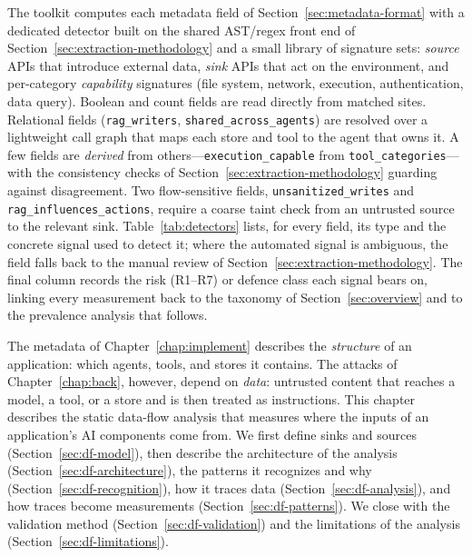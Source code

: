 \label{sec:toolkit}

The toolkit computes each metadata field of Section~\ref{sec:metadata-format}
with a dedicated detector built on the shared AST/regex front end of
Section~\ref{sec:extraction-methodology} and a small library of signature
sets: \emph{source} APIs that introduce external data, \emph{sink} APIs that
act on the environment, and per-category \emph{capability} signatures (file
system, network, execution, authentication, data query). Boolean and count
fields are read directly from matched sites. Relational fields
(\texttt{rag\_writers}, \texttt{shared\_across\_agents}) are resolved over a
lightweight call graph that maps each store and tool to the agent that owns
it. A few fields are \emph{derived} from others---\texttt{execution\_capable}
from \texttt{tool\_categories}---with the consistency checks of
Section~\ref{sec:extraction-methodology} guarding against disagreement.
Two flow-sensitive fields, \texttt{unsanitized\_writes} and
\texttt{rag\_influences\_actions}, require a coarse taint check from an
untrusted source to the relevant sink. Table~\ref{tab:detectors} lists, for
every field, its type and the concrete signal used to detect it; where the
automated signal is ambiguous, the field falls back to the manual review of
Section~\ref{sec:extraction-methodology}. The final column records the
risk (R1--R7) or defence class each signal bears on, linking every
measurement back to the taxonomy of Section~\ref{sec:overview} and to the
prevalence analysis that follows.



\providecommand{\pv}[1]{\textcolor{blue}{#1}} %
\label{sec:toolkit}

The metadata of Chapter~\ref{chap:implement} describes the \emph{structure} of an application: which agents, tools, and stores it contains. The attacks of Chapter~\ref{chap:back}, however, depend on \emph{data}: untrusted content that reaches a model, a tool, or a store and is then treated as instructions. This chapter describes the static data-flow analysis that measures where the inputs of an application's AI components come from. We first define sinks and sources (Section~\ref{sec:df-model}), then describe the architecture of the analysis (Section~\ref{sec:df-architecture}), the patterns it recognizes and why (Section~\ref{sec:df-recognition}), how it traces data (Section~\ref{sec:df-analysis}), and how traces become measurements (Section~\ref{sec:df-patterns}). We close with the validation method (Section~\ref{sec:df-validation}) and the limitations of the analysis (Section~\ref{sec:df-limitations}).

